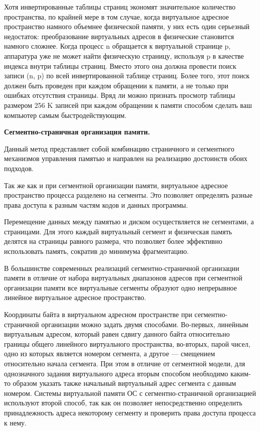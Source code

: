 Хотя инвертированные таблицы страниц экономят значительное количество пространства, по крайней мере в том случае, когда виртуальное адресное пространство намного объемнее физической памяти, у них есть один серьезный недостаток: преобразование виртуальных адресов в физические становится намного сложнее. Когда процесс n обращается к виртуальной странице p, аппаратура уже не может найти физическую страницу, используя p в качестве индекса внутри таблицы страниц. Вместо этого она должна провести поиск записи (n, p) по всей инвертированной таблице страниц. Более того, этот поиск должен быть проведен при каждом обращении к памяти, а не только при ошибках отсутствия страницы. Вряд ли можно признать просмотр таблицы размером 256 K записей при каждом обращении к памяти способом сделать ваш компьютер самым быстродействующим.

\begin{center}{\bfseries Сегментно-страничная организация памяти.}
\end{center}

Данный метод представляет собой комбинацию страничного и сегментного механизмов управления памятью и направлен на реализацию достоинств обоих подходов.

Так же как и при сегментной организации памяти, виртуальное адресное пространство процесса разделено на сегменты. Это позволяет определять разные права доступа к разным частям кодов и данных программы.

Перемещение данных между памятью и диском осуществляется не сегментами, а страницами. Для этого каждый виртуальный сегмент и физическая память делятся на страницы равного размера, что позволяет более эффективно использовать память, сократив до минимума фрагментацию.

В большинстве современных реализаций сегментно-страничной организации памяти в отличие от набора виртуальных диапазонов адресов при сегментной организации памяти все виртуальные сегменты образуют одно непрерывное линейное виртуальное адресное пространство.

Координаты байта в виртуальном адресном пространстве при сегментно-страничной организации можно задать двумя способами. Во-первых, линейным виртуальным адресом, который равен сдвигу данного байта относительно границы общего линейного виртуального пространства, во-вторых, парой чисел, одно из которых является номером сегмента, а другое — смещением относительно начала сегмента. При этом в отличие от сегментной модели, для однозначного задания виртуального адреса вторым способом необходимо каким-то образом указать также начальный виртуальный адрес сегмента с данным номером. Системы виртуальной памяти ОС с сегментно-страничной организацией используют второй способ, так как он позволяет непосредственно определить принадлежность адреса некоторому сегменту и проверить права доступа процесса к нему.

